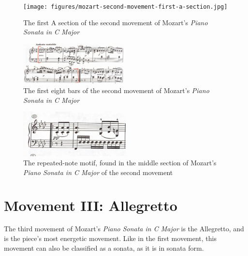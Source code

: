 \begin{figure}
    \centering
    \texttt{[image: figures/mozart-second-movement-first-a-section.jpg]}
    \caption{The first A section of the second movement of Mozart's \textit{Piano Sonata in C Major}}
    \label{fig:mozart-second-movement-first-a-section}
\end{figure}

\begin{figure}
    \centering
    \includegraphics[width=0.5\textwidth]{figures/mozart-second-movement-first-eight-bars.jpg}
    \caption{The first eight bars of the second movement of Mozart's \textit{Piano Sonata in C Major}}
    \label{fig:mozart-second-movement-first-eight-bars}
\end{figure}

\begin{figure}
    \centering
    \includegraphics[width=0.5\textwidth]{figures/mozart-second-movement-repeated-note-motif-middle-section.jpg}
    \caption{The repeated-note motif, found in the middle section of Mozart's \textit{Piano Sonata in C Major} of the second movement}
    \label{fig:mozart-second-movement-middle-section-motif}
\end{figure}

\section{Movement III: Allegretto}
The third movement of Mozart's \textit{Piano Sonata in C Major} is the Allegretto, and is the piece's most energetic movement. Like in the first movement, this movement can also be classified as a sonata, as it is in sonata form. 

